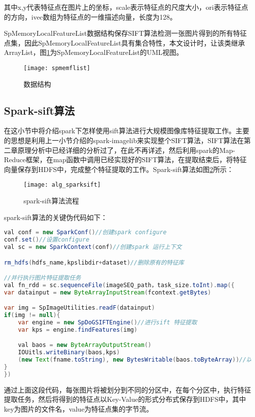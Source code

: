 其中x,y代表特征点在图片上的坐标，scale表示特征点的尺度大小，ori表示特征点的方向，ivec数组为特征点的一维描述向量，长度为128。

SpMemoryLocalFeatureList数据结构保存SIFT算法检测一张图片得到的所有特征点集，因此SpMemoryLocalFeatureList具有集合特性，本文设计时，让该类继承ArrayList，图\ref{fig:spmemflist}为SpMemoryLocalFeatureList的UML视图。
\begin{figure}[htp]
\centering
\texttt{[image: spmemflist]}
\caption{数据结构}
\label{fig:spmemflist}
\end{figure}

\subsection{Spark-sift算法}
在这小节中将介绍spark下怎样使用sift算法进行大规模图像库特征提取工作。主要的思想是利用上一小节介绍的spark-imagelib来实现整个SIFT算法，SIFT算法在第二章原理分析中已经详细的分析过了，在此不再详述，然后利用spark的Map-Reduce框架，在map函数中调用已经实现好的SIFT算法，在提取结束后，将特征向量保存到HDFS中，完成整个特征提取的工作。Spark-sift算法如图\ref{fig:alg_sparksift}所示：
\begin{figure}[htp]
\centering
\texttt{[image: alg\_sparksift]}
\caption{spark-sift算法流程}
\label{fig:alg_sparksift}
\end{figure}

spark-sift算法的关键伪代码如下：
\begin{lstlisting}[language=Java]
val conf = new SparkConf()//创建spark configure
conf.set()//设置configure
val sc = new SparkContext(conf)//创建spark 运行上下文

rm_hdfs(hdfs_name,kpslibdir+dataset)//删除原有的特征库

//并行执行图片特征提取任务
val fn_rdd = sc.sequenceFile(imageSEQ_path，task_size.toInt).map({
var datainput = new ByteArrayInputStream(fcontext.getBytes)

var img = SpImageUtilities.readF(datainput)
if(img != null){
    var engine = new SpDoGSIFTEngine()//进行sift 特征提取
    var kps = engine.findFeatures(img)

    val baos = new ByteArrayOutputStream()
    IOUitls.writeBinary(baos,kps)
    (new Text(fname.toString), new BytesWritable(baos.toByteArray))//以key-value形式返回提取的特征点，key为图片名，value为特征点集
}
})
\end{lstlisting}

通过上面这段代码，每张图片将被划分到不同的分区中，在每个分区中，执行特征提取任务，然后将得到的特征点以Key-Value的形式分布式保存到HDFS中，其中key为图片的文件名，value为特征点集的字节流。
